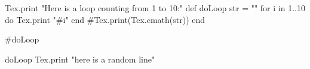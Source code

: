 \documentclass{article}
\begin{document}
\begin{rbtex}
Tex.print "Here is a loop counting from 1 to 10:"
def doLoop
    str = ""
    for i in 1..10 do
        Tex.print "#{i}"
    end
    #Tex.print(Tex.cmath(str))
end

#doLoop

doLoop
Tex.print "here is a random line"
\end{rbtex}
\end{document}
